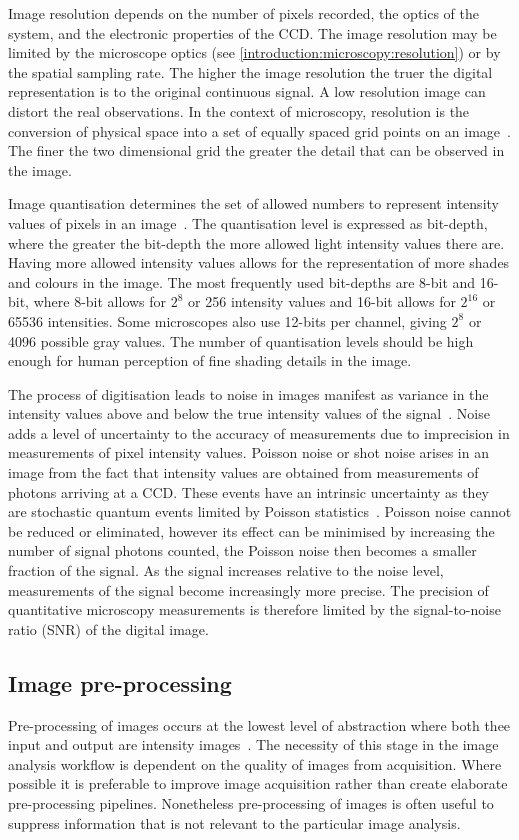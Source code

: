 Image resolution depends on the number of pixels recorded, the optics of the system, and the electronic properties of the CCD. The image resolution may be limited by the microscope optics (see \autoref{introduction:microscopy:resolution}) or by the spatial sampling rate. The higher the image resolution the truer the digital representation is to the original continuous signal. A low resolution image can distort the real observations. In the context of microscopy, resolution is the conversion of physical space into a set of equally spaced grid points on an image~\cite{Russ2006}. The finer the two dimensional grid the greater the detail that can be observed in the image.

Image quantisation determines the set of allowed numbers to represent intensity values of pixels in an image~\cite{Pawley2006}. The quantisation level is expressed as bit-depth, where the greater the bit-depth the more allowed light intensity values there are. Having more allowed intensity values allows for the representation of more shades and colours in the image. The most frequently used bit-depths are 8-bit and 16-bit, where 8-bit allows for $2^{8}$ or 256 intensity values and 16-bit allows for $2^{16}$ or 65536 intensities. Some microscopes also use 12-bits per channel, giving $2^{8}$ or 4096 possible gray values. The number of quantisation levels should be high enough for human perception of fine shading details in the image.

The process of digitisation leads to noise in images manifest as variance in the intensity values above and below the true intensity values of the signal~\cite{Waters2009}. Noise adds a level of uncertainty to the accuracy of measurements due to imprecision in measurements of pixel intensity values. Poisson noise or shot noise arises in an image from the fact that intensity values are obtained from measurements of photons arriving at a CCD. These events have an intrinsic uncertainty as they are stochastic quantum events limited by Poisson statistics~\cite{Pawley2000}. Poisson noise cannot be reduced or eliminated, however its effect can be minimised by increasing the number of signal photons counted, the Poisson noise then becomes a smaller fraction of the signal. As the signal increases relative to the noise level, measurements of the signal become increasingly more precise. The precision of quantitative microscopy measurements is therefore limited by the signal-to-noise ratio (SNR) of the digital image.

\subsection{Image pre-processing}
\label{introduction:image_processing:image_preprocessing}
Pre-processing of images occurs at the lowest level of abstraction where both thee input and output are intensity images~\cite{Sonka2007}. The necessity of this stage in the image analysis workflow is dependent on the quality of images from acquisition. Where possible it is preferable to improve image acquisition rather than create elaborate pre-processing pipelines. Nonetheless pre-processing of images is often useful to suppress information that is not relevant to the particular image analysis.

